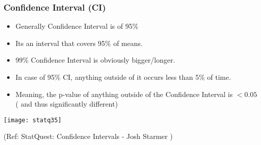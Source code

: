\begin{frame}[fragile]\frametitle{Confidence Interval (CI)}

	\begin{itemize}
	\item Generally Confidence Interval is of 95\%
	\item Its an interval that covers 95\% of means.
	\item 99\% Confidence Interval is obviously bigger/longer.
	\item In case of 95\% CI, anything outside of it occurs less than 5\% of time.
	\item Meaning, the p-value of anything outside of the Confidence Interval is $ < 0.05$ ( and thus significantly different)
	\end{itemize}


      \begin{center}
      \texttt{[image: statq35]}
	 
	  
	  	\end{center}

  
\tiny{(Ref: StatQuest: Confidence Intervals - Josh Starmer )}
\end{frame}

